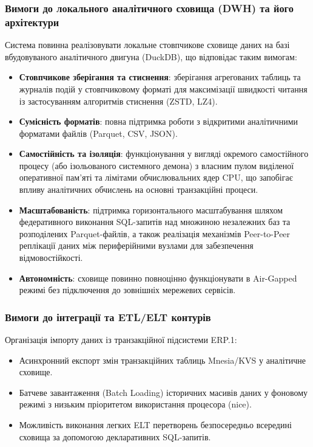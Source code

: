\documentclass{article}
\begin{document}
\subsubsection{Вимоги до локального аналітичного сховища (DWH) та його архітектури}
Система повинна реалізовувати локальне стовпчикове сховище даних на базі вбудовуваного аналітичного двигуна (DuckDB), що відповідає таким вимогам:
\begin{itemize}
    \item \textbf{Стовпчикове зберігання та стиснення}: зберігання агрегованих таблиць та журналів подій у стовпчиковому форматі для максимізації швидкості читання із застосуванням алгоритмів стиснення (ZSTD, LZ4).
    \item \textbf{Сумісність форматів}: повна підтримка роботи з відкритими аналітичними форматами файлів (Parquet, CSV, JSON).
    \item \textbf{Самостійність та ізоляція}: функціонування у вигляді окремого самостійного процесу (або ізольованого системного демона) з власним пулом виділеної оперативної пам'яті та лімітами обчислювальних ядер CPU, що запобігає впливу аналітичних обчислень на основні транзакційні процеси.
    \item \textbf{Масштабованість}: підтримка горизонтального масштабування шляхом федеративного виконання SQL-запитів над множиною незалежних баз та розподілених Parquet-файлів, а також реалізація механізмів Peer-to-Peer реплікації даних між периферійними вузлами для забезпечення відмовостійкості.
    \item \textbf{Автономність}: сховище повинно повноцінно функціонувати в Air-Gapped режимі без підключення до зовнішніх мережевих сервісів.
\end{itemize}

\subsubsection{Вимоги до інтеграції та ETL/ELT контурів}
Організація імпорту даних із транзакційної підсистеми ERP.1:
\begin{itemize}
    \item Асинхронний експорт змін транзакційних таблиць Mnesia/KVS у аналітичне сховище.
    \item Батчеве завантаження (Batch Loading) історичних масивів даних у фоновому режимі з низьким пріоритетом використання процесора (nice).
    \item Можливість виконання легких ELT перетворень безпосередньо всередині сховища за допомогою декларативних SQL-запитів.
\end{itemize}
\end{document}
